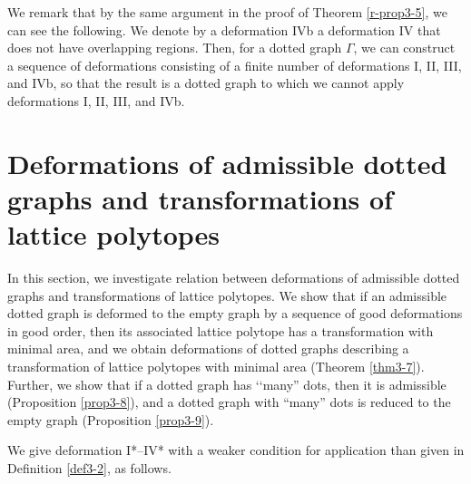 \documentclass[a4paper,11pt]{amsart}
\numberwithin{equation}{section}
\begin{document}
 
\begin{remark}\label{rem920}
We remark that by the same argument in the proof of Theorem \ref{r-prop3-5}, we can see the following. 
We denote by a deformation IVb a deformation IV that does not have overlapping regions. 
Then, for a dotted graph $\Gamma$, we can construct a sequence of deformations consisting of a finite number of deformations I, II, III, and IVb, so that the result is a dotted graph to which we cannot apply deformations I, II, III, and IVb. 
\end{remark}

 
 

\section{Deformations of admissible dotted graphs and transformations of lattice polytopes}\label{deformation}

In this section, we investigate relation between deformations of admissible dotted graphs and transformations of lattice polytopes. We show that if an admissible dotted graph is deformed to the empty graph by a sequence of good deformations in good order, then its associated lattice polytope has a transformation with minimal area, and we obtain deformations of dotted graphs describing a transformation of lattice polytopes with minimal area (Theorem \ref{thm3-7}). 
Further, we show that if a dotted graph has \lq\lq many'' dots, then it is admissible (Proposition \ref{prop3-8}), and a dotted graph with ``many'' dots is reduced to the empty graph (Proposition \ref{prop3-9}). 

We give deformation I*--IV* with a weaker condition for application than given in Definition \ref{def3-2}, as follows. %
\end{document}
